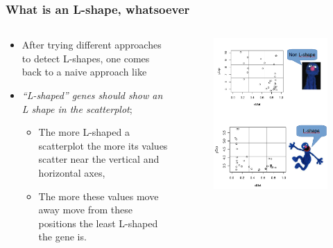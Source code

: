 \documentclass[handout]{beamer}
\begin{document}
\begin{frame}
	\frametitle{What is an L-shape, whatsoever}
\begin{columns}%
	\begin{column}[t]{0.5\textwidth}%
		
		\begin{itemize}
			\item After trying different approaches to detect L-shapes, one  comes back to a naive approach like 
			\item \emph{``L-shaped'' genes should show an L shape in the scatterplot}; 
				\begin{itemize}
					\item  The more L-shaped a scatterplot the more its values scatter near the vertical and horizontal axes,
					\item The more these values move away move from these positions the least L-shaped the gene is.
				\end{itemize}
		\end{itemize}
		
	\end{column}
	\begin{column}[t]{0.5\textwidth}%
		\begin{center}
			\begin{figure}[h]          
				\includegraphics[width=\textwidth]{images/LshapeNonLshape.png}
			\end{figure}
		\end{center}
	\end{column}
\end{columns}	
\end{frame}
\end{document}
